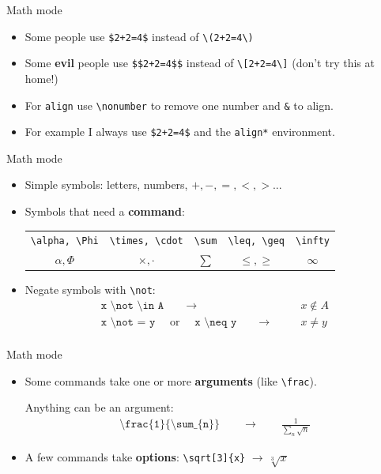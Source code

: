 \documentclass[11pt]{beamer}
\newcommand{\bs}{\textbackslash}
\begin{document}
\begin{frame}{Math mode}
  \begin{itemize}
    \item Some people use \texttt{\$2+2=4\$} instead of \texttt{\bs(2+2=4\bs)}
    \item Some \textbf{evil} people use \texttt{\$\$2+2=4\$\$} instead of
          \texttt{\bs[2+2=4\bs]} (don't try this at home!)
    \item For \texttt{align} use \texttt{\bs nonumber} to remove one number
          and \texttt{\&} to align.
    \item For example I always use \texttt{\$2+2=4\$} and the \texttt{align*}
          environment.
  \end{itemize}
\end{frame}

\begin{frame}{Math mode}
  \begin{itemize}
    \item Simple symbols: letters, numbers, $+,-,=,<,>$...
    \item Symbols that need a \textbf{command}:

          \vspace{0.6cm}
          \begin{tabular}{c|c|c|c|c}
            \texttt{\bs alpha, \bs Phi} & \texttt{\bs times, \bs cdot} &
            \texttt{\bs sum} & \texttt{\bs leq, \bs geq} & \texttt{\bs infty}\\
            $\alpha,\Phi$ & $\times,\cdot$ & $\sum$ & $\leq,\geq$ & $\infty$
          \end{tabular}
          \vspace{0.6cm}
    \item Negate symbols with \texttt{\bs not}:
          \begin{align*}
            \texttt{x \bs not \bs in A} \qquad\to&\qquad x\not\in A\\
            \texttt{x \bs not = y}\quad\text{ or }\quad\texttt{x \bs neq y}
             \qquad\to&\qquad x\neq y\\
          \end{align*}
  \end{itemize}
\end{frame}

\begin{frame}{Math mode}
  \begin{itemize}
    \item Some commands take one or more \textbf{arguments} (like 
          \texttt{\bs frac}).
          
          Anything can be an argument:
          \begin{align*}
            \texttt{\bs frac\{1\}\{\bs sum\_\{n\}\}}\qquad\to\qquad
            \frac{1}{\sum_{n} \sqrt n}
          \end{align*}
    \item A few commands take \textbf{options}:
          \texttt{\bs sqrt[3]\{x\}} $\to\,\sqrt[3]{x}$
  \end{itemize}
\end{frame}
\end{document}
